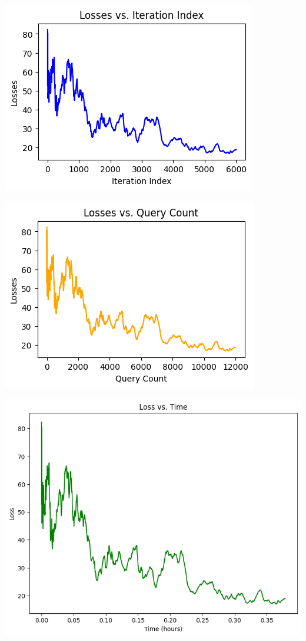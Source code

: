 \documentclass[10pt,twocolumn,letterpaper]{article}
\begin{document}
\begin{center}
   \includegraphics*[scale=0.7]{img/RDSA_loss_vs_iterations.png}
\end{center}

\begin{center}
   \includegraphics*[scale=0.7]{img/RDSA_loss_vs_querycount.png}
\end{center}

\begin{center}
   \includegraphics*[scale=0.4]{img/RDSA_loss_vs_time.png}
\end{center}
\end{document}

